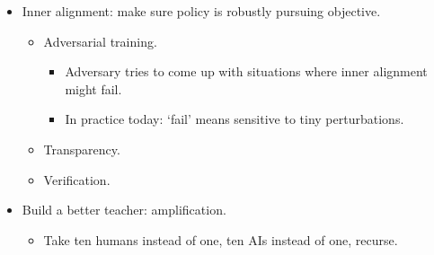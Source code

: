 \begin{itemize}
\begin{itemize}
    \end{itemize}
    \item Inner alignment: make sure policy is robustly pursuing objective.
    \begin{itemize}
        \item Adversarial training.
        \begin{itemize}
            \item Adversary tries to come up with situations where inner alignment might fail.
            \item In practice today: `fail' means sensitive to tiny perturbations.
        \end{itemize}
        \item Transparency.
        \item Verification.
    \end{itemize}
    \item Build a better teacher: amplification.
    \begin{itemize}
        \item Take ten humans instead of one, ten AIs instead of one, recurse.
    \end{itemize}
\end{itemize}
